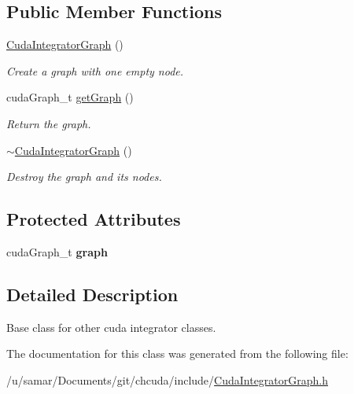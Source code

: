 \subsection*{Public Member Functions}
\begin{DoxyCompactItemize}
\item 
\hypertarget{classCudaIntegratorGraph_ada9aeaf0aa6304abfcf095c72eaff25b}{}\label{classCudaIntegratorGraph_ada9aeaf0aa6304abfcf095c72eaff25b} 
\hyperlink{classCudaIntegratorGraph_ada9aeaf0aa6304abfcf095c72eaff25b}{Cuda\+Integrator\+Graph} ()
\begin{DoxyCompactList}\small\item\em Create a graph with one empty node. \end{DoxyCompactList}\item 
\hypertarget{classCudaIntegratorGraph_a32f852954891dc8af98a2b4b13885e1c}{}\label{classCudaIntegratorGraph_a32f852954891dc8af98a2b4b13885e1c} 
cuda\+Graph\+\_\+t \hyperlink{classCudaIntegratorGraph_a32f852954891dc8af98a2b4b13885e1c}{get\+Graph} ()
\begin{DoxyCompactList}\small\item\em Return the graph. \end{DoxyCompactList}\item 
\hypertarget{classCudaIntegratorGraph_a755fba1dde4ecb2e69b11ef279db9f0c}{}\label{classCudaIntegratorGraph_a755fba1dde4ecb2e69b11ef279db9f0c} 
\hyperlink{classCudaIntegratorGraph_a755fba1dde4ecb2e69b11ef279db9f0c}{$\sim$\+Cuda\+Integrator\+Graph} ()
\begin{DoxyCompactList}\small\item\em Destroy the graph and its nodes. \end{DoxyCompactList}\end{DoxyCompactItemize}
\subsection*{Protected Attributes}
\begin{DoxyCompactItemize}
\item 
\hypertarget{classCudaIntegratorGraph_a0811a0058f6b1bea2a9eef5392bddfba}{}\label{classCudaIntegratorGraph_a0811a0058f6b1bea2a9eef5392bddfba} 
cuda\+Graph\+\_\+t {\bfseries graph}
\end{DoxyCompactItemize}


\subsection{Detailed Description}
Base class for other cuda integrator classes. 



The documentation for this class was generated from the following file\+:\begin{DoxyCompactItemize}
\item 
/u/samar/\+Documents/git/chcuda/include/\hyperlink{CudaIntegratorGraph_8h}{Cuda\+Integrator\+Graph.\+h}\end{DoxyCompactItemize}
